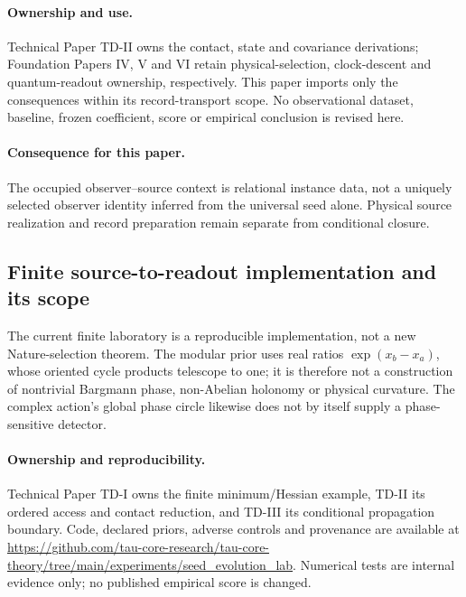 \documentclass[11pt]{article}
\begin{document}
\paragraph{Ownership and use.}
Technical Paper TD-II owns the contact, state and covariance derivations;
Foundation Papers IV, V and VI retain physical-selection, clock-descent and
quantum-readout ownership, respectively. This paper imports only the
consequences within its record-transport scope. No observational dataset,
baseline, frozen coefficient, score or empirical conclusion is revised here.

\paragraph{Consequence for this paper.}
The occupied observer--source context is relational instance data, not a uniquely selected observer identity inferred from the universal seed alone. Physical source realization and record preparation remain separate from conditional closure.

\subsection{Finite source-to-readout implementation and its scope}
The current finite laboratory is a reproducible implementation, not a new Nature-selection theorem. The modular prior uses real ratios $\exp(x_b-x_a)$, whose oriented cycle products telescope to one; it is therefore not a construction of nontrivial Bargmann phase, non-Abelian holonomy or physical curvature. The complex action's global phase circle likewise does not by itself supply a phase-sensitive detector.
\paragraph{Ownership and reproducibility.}
Technical Paper TD-I owns the finite minimum/Hessian example, TD-II its ordered access and contact reduction, and TD-III its conditional propagation boundary. Code, declared priors, adverse controls and provenance are available at \url{https://github.com/tau-core-research/tau-core-theory/tree/main/experiments/seed_evolution_lab}. Numerical tests are internal evidence only; no published empirical score is changed.

\end{document}
